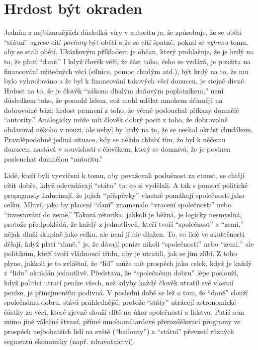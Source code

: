 \documentclass{book}
\begin{document}
\section{Hrdost být okraden}

Jedním z nejbizarnějších důsledků víry v autoritu je, že způsobuje, že se oběti \enquote{státní} agrese cítí \emph{povinny} být obětí a že se cítí špatně, pokud se \emph{vyhnou} tomu, aby se stali obětí. Ukázkovým příkladem je občan, který prohlašuje, že je hrdý na to, že platí \enquote{daně.} I když člověk věří, že část toho, čeho se vzdává, je použita na financování užitečných věcí (silnice, pomoc chudým atd.), být hrdý na to, že mu bylo vyhrožováno a že byl k financování takových věcí donucen, je stejně divné. Hrdost na to, že je člověk \enquote{zákona dbalým daňovým poplatníkem,} není důsledkem toho, že pomohl lidem, což mohl udělat mnohem účinněji na dobrovolné bázi; hrdost pramení z toho, že věrně poslouchal příkazy domnělé \enquote{autority.} Analogicky může mít člověk dobrý pocit z toho, že dobrovolně obdaroval někoho v nouzi, ale nebyl by hrdý na to, že se nechal okrást chudákem. Pravděpodobně jediná situace, kdy se někdo chlubí tím, že byl k něčemu donucen, nastává v souvislosti s člověkem, který se domnívá, že je povinen poslouchat domnělou \enquote{autoritu.}

Lidé, kteří byli vycvičeni k tomu, aby považovali poslušnost za ctnost, se chtějí cítit dobře, když odevzdávají \enquote{státu} to, co si vydělali. A tak s pomocí politické propagandy halucinují, že jejich \enquote{příspěvky} vlastně pomáhají společnosti jako celku. Mluví, jako by placení \enquote{daní} znamenalo \enquote{vracení společnosti} nebo \enquote{investování do země.} Taková rétorika, jakkoli je běžná, je logicky nesmyslná, protože předpokládá, že každý z jednotlivců, kteří tvoří \enquote{společnost} a \enquote{zemi,} nějak dluží skupině jako celku, ale není jí nic dlužen. To, co lidé ve skutečnosti dělají, když platí \enquote{daně,} je, že dávají peníze nikoli \enquote{společnosti} nebo \enquote{zemi,} ale politikům, kteří tvoří vládnoucí třídu, aby je utratili, jak se jim zlíbí. Z toho plyne, jakkoli je to zvláštní, že \enquote{lid} může mít prospěch jako celek, když je každý z \enquote{lidu} okrádán jednotlivě. Představa, že \enquote{společnému dobru} lépe poslouží, když politici utratí peníze všech, než kdyby každý člověk utratil své vlastní peníze, je přinejmenším podivná. V poslední době se lež o tom, že \enquote{daně} slouží společnému dobru, stává průhlednější, protože \enquote{státy} utrácejí astronomické částky za věci, které zjevně slouží elitě na úkor společnosti a lidstva. Patří sem mimo jiné válečné štvaní, přímé mnohamiliardové přerozdělovací programy ve prospěch nejbohatších lidí na světě (\enquote{bailouty}) a \enquote{státní} převzetí různých segmentů ekonomiky (např. zdravotnictví).
\end{document}
